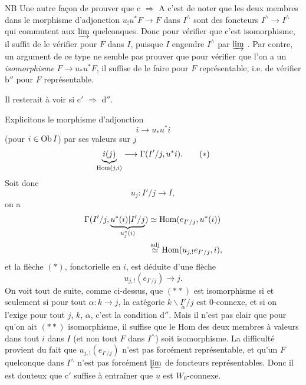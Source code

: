 NB Une autre façon de prouver que c $\Longrightarrow$ A c'est de noter que les deux membres dans le morphisme d'adjonction $u_!u^*F \longrightarrow F$ dans $I^{\wedge}$ sont des foncteurs $I^{\wedge} \longrightarrow I^{\wedge}$ qui commutent aux $\varinjlim$ quelconques. Donc pour vérifier que c'est isomorphisme, il suffit de le vérifier pour $F$ dans $I$, puisque $I$ engendre $I^{\wedge}$ par $\varinjlim$ . Par contre, un argument de ce type ne semble pas prouver que pour vérifier que l'on a un \textit{isomorphisme} $F \longrightarrow u_*u^*F$, il suffise de le faire pour $F$ représentable, i.e. de vérifier b$''$ pour $F$ représentable.

Il resterait à voir si c$'$ $\Longrightarrow$ d$''$.

Explicitons le morphisme d'adjonction
\[
i \longrightarrow u_*u^*i
\]
(pour $i \in \operatorname{Ob} I$) par ses valeurs sur $j$
\[
\underbrace{i(j)}_{\Hom(j,i)} \longrightarrow \Gamma(I'/j, u^*i). \tag*{$(\ast)$}
\]
Soit donc
\[
u_j : I'/j \longrightarrow I,
\]
on a
\[
\begin{aligned}
\Gamma(I'/j, \underbrace{u^*(i)|I'/j}_{u_j^*(i)}) &\simeq \Hom(e_{I'/j}, u^*(i)) \\ %
&\overset{\mathrm{adj}}{\simeq} \Hom(u_{j,!}e_{I'/j}, i),
\end{aligned}
\]
et la flèche $(\ast)$, fonctorielle en $i$, est déduite d'une flèche
\[
u_{j,!}(e_{I'/j}) \longrightarrow j. \tag*{$(\ast\ast)$}
\]
On voit tout de suite, comme ci-dessus, que $(\ast\ast)$ est isomorphisme si et seulement si pour tout $\alpha : k \longrightarrow j$, la catégorie $k\backslash\underset{\alpha}{I'}/j$ est 0-connexe, et si on l'exige pour tout $j$, $k$, $\alpha$, c'est la condition d$''$. Mais il n'est pas clair que pour qu'on ait $(\ast\ast)$ isomorphisme, il suffise que le Hom des deux membres à valeurs dans tout $i$ dans $I$ (et non tout $F$ dans $I^{\wedge}$) soit isomorphisme. La difficulté provient du fait que $u_{j,!}(e_{I'/j})$ n'est pas forcément représentable, et qu'un $F$ quelconque dans $I^{\wedge}$ n'est pas forcément $\varprojlim$ de foncteurs représentables. Donc il est douteux que c$'$ suffise à entraîner que $u$ est $W_0$-connexe.

